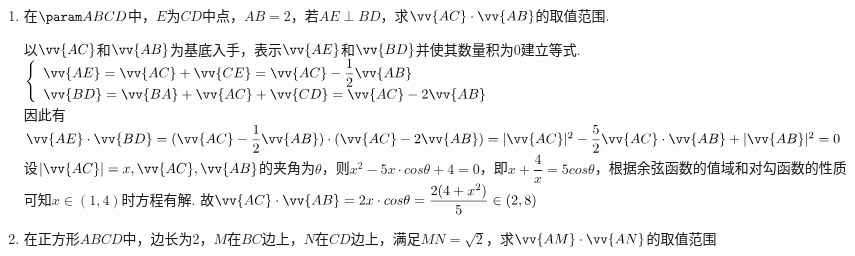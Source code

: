 \begin{enumerate}
\begin{enumerate}
        
        \item 在$\param ABCD$中，$E$为$CD$中点，$AB = 2$，若$AE \perp BD$，求$\vv{AC} \cdot \vv{AB}$的取值范围.
        \begin{jieda}
            以$\vv{AC}$和$\vv{AB}$为基底入手，表示$\vv{AE}$和$\vv{BD}$并使其数量积为0建立等式. \\
            $\left \{\begin{array}{l}
                 \vv{AE} = \vv{AC} + \vv{CE} =  \vv{AC} - \dfrac{1}{2}\vv{AB}  \\
                 \vv{BD} = \vv{BA} + \vv{AC} + \vv{CD} = \vv{AC} - 2\vv{AB} 
            \end{array} \right. $ \\
            因此有$\vv{AE} \cdot \vv{BD} = (\vv{AC} - \dfrac{1}{2}\vv{AB}) \cdot (\vv{AC} - 2\vv{AB}) = |\vv{AC}|^2 - \dfrac{5}{2} \vv{AC} \cdot \vv{AB} + |\vv{AB}|^2 = 0$\\
            设$|\vv{AC}| = x, \vv{AC}, \vv{AB}$的夹角为$\theta$，则$x^2 - 5x \cdot cos\theta + 4 = 0$，即$x + \dfrac{4}{x} = 5 cos\theta$，根据余弦函数的值域和对勾函数的性质可知$x \in (1,4)$时方程有解. 故$\vv{AC} \cdot \vv{AB} = 2x \cdot cos\theta = \dfrac{2(4+x^2)}{5} \in (2, 8)$
        \end{jieda}
        
        \item 在正方形$ABCD$中，边长为2，$M$在$BC$边上，$N$在$CD$边上，满足$MN=\sqrt{2}$，求$\vv{AM}\cdot \vv{AN}$的取值范围\blkda{$[4, 8-2\sqrt{2}]$}
        \begin{jieda}
\end{jieda}
\end{enumerate}
\end{enumerate}
